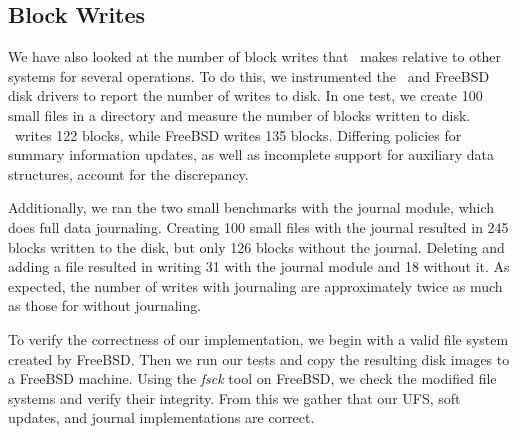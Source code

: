 \subsection {Block Writes}

We have also looked at the number of block writes that \Kudos\ makes
relative to other systems for several operations. To do this, we
instrumented the \Kudos\ and FreeBSD disk drivers to report the number
of writes to disk. In one test, we create 100 small files in a directory and
measure the number of blocks written to disk. \Kudos\ writes 122 blocks, while
FreeBSD writes 135 blocks. Differing policies for summary information updates,
as well as incomplete support for auxiliary data structures, account for the
discrepancy.

Additionally, we ran the two small benchmarks with the journal module,
which does full data journaling. Creating 100 small files with the journal
resulted in 245 blocks written to the disk, but only 126 blocks
without the journal. Deleting and adding a file resulted in writing
31 with the journal module and 18 without it. As expected, the number of writes
with journaling are approximately twice as much as those for without
journaling.

To verify the correctness of our implementation, we begin with a valid file
system created by FreeBSD. Then we run our tests and copy the resulting disk
images to a FreeBSD machine. Using the \emph{fsck} tool on FreeBSD, we check
the modified file systems and verify their integrity. From this we gather that
our UFS, soft updates, and journal implementations are correct.

